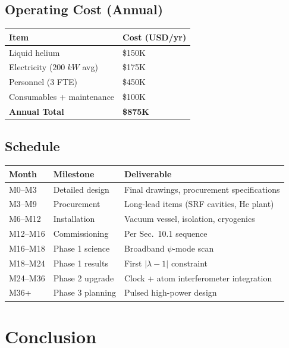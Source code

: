 \documentclass[11pt,a4paper]{article}
\begin{document}
\subsection{Operating Cost (Annual)}

\begin{longtable}{p{}p{}}
\toprule
\textbf{Item} & \textbf{Cost (USD/yr)} \\
\midrule
\endhead
Liquid helium & \$150K \\
Electricity ($200\;\si{kW}$ avg) & \$175K \\
Personnel (3 FTE) & \$450K \\
Consumables + maintenance & \$100K \\
\midrule
\textbf{Annual Total} & \textbf{\$875K} \\
\bottomrule
\end{longtable}

\subsection{Schedule}

\begin{longtable}{p{}p{}p{}}
\toprule
\textbf{Month} & \textbf{Milestone} & \textbf{Deliverable} \\
\midrule
\endhead
M0--M3 & Detailed design & Final drawings, procurement specifications \\
M3--M9 & Procurement & Long-lead items (SRF cavities, He plant) \\
M6--M12 & Installation & Vacuum vessel, isolation, cryogenics \\
M12--M16 & Commissioning & Per Sec.~10.1 sequence \\
M16--M18 & Phase 1 science & Broadband $\psi$-mode scan \\
M18--M24 & Phase 1 results & First $|\lambda - 1|$ constraint \\
M24--M36 & Phase 2 upgrade & Clock + atom interferometer integration \\
M36+ & Phase 3 planning & Pulsed high-power design \\
\bottomrule
\end{longtable}

\section{Conclusion}
\end{document}
